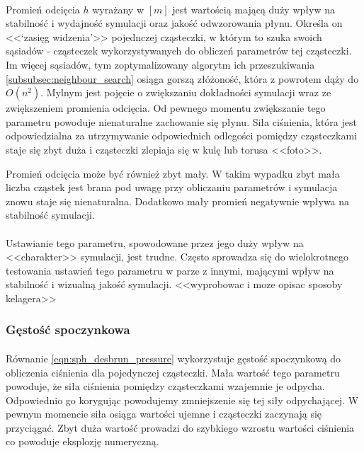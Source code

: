 \paragraph{}
Promień odcięcia $h$ wyrażany w $[m]$ jest wartością mającą duży wpływ na stabilność i wydajność symulacji oraz jakość odwzorowania płynu. Określa on <<`zasięg widzenia'>> pojednczej cząsteczki, w którym to szuka swoich sąsiadów - cząsteczek wykorzystywanych do obliczeń parametrów tej cząsteczki. Im więcej sąsiadów, tym zoptymalizowany algorytm ich przeszukiwania \eqref{subsubsec:neighbour_search} osiąga gorszą złóżoność, która z powrotem dąży do $O(n^2)$. Mylnym jest pojęcie o zwiększaniu dokładności symulacji wraz ze zwiększeniem promienia odcięcia. Od pewnego momentu zwiększanie tego parametru powoduje nienaturalne zachowanie się płynu. Siła ciśnienia, która jest odpowiedzialna za utrzymywanie odpowiednich odlegości pomiędzy cząsteczkami staje się zbyt duża i cząsteczki zlepiaja się w kulę lub torusa <<foto>>.
\par Promień odcięcia może być również zbyt mały. W takim wypadku zbyt mała liczba cząstek jest brana pod uwagę przy obliczaniu parametrów i symulacja znowu staje się nienaturalna. Dodatkowo mały promień negatywnie wpływa na stabilność symulacji.
\par
\paragraph{}
Ustawianie tego parametru, spowodowane przez jego duży wpływ na <<charakter>> symulacji, jest trudne. Często sprowadza się do wielokrotnego testowania ustawień tego parametru w parze z innymi, mającymi wpływ na stabilność i wizualną jakość symulacji. <<wyprobowac i moze opisac sposoby kelagera>>
\par

\subsubsection{Gęstość spoczynkowa}

\paragraph{}
Równanie \eqref{eqn:sph_desbrun_pressure} wykorzystuje gęstość spoczynkową do obliczenia ciśnienia dla pojedynczej cząsteczki. Mała wartość tego parametru powoduje, że siła ciśnienia pomiędzy cząsteczkami wzajemnie je odpycha. Odpowiednio go korygując powodujemy zmniejszenie się tej siły odpychającej. W pewnym momencie siła osiąga wartości ujemne i cząsteczki zaczynają się przyciągać. Zbyt duża wartość prowadzi do szybkiego wzrostu wartości ciśnienia co powoduje eksplozję numeryczną.
\par

